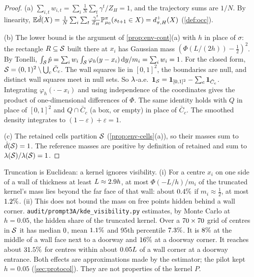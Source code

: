 \begin{proof}
(a) $\sum_{i,t}w_{i,t}=\sum_i\frac1N\sum_t\gamma^t/Z_H=1$, and the trajectory sums are $1/N$. By linearity, $\E\hat d(X)=\frac1N\sum_i\sum_t\frac{\gamma^t}{Z_H}\Prob^\pi_{\mu_0}(s_{t+1}\in X)=d^+_{\pi,H}(X)$ (\cref{def:occ}).

(b) The lower bound is the argument of \cref{prop:env-cont}(a) with $h$ in place of $\sigma$: the rectangle $R\subseteq\cS$ built there at $x_i$ has Gaussian mass $(\Phi(L/(2h))-\frac12)^2$.
By Tonelli, $\int_\cS\hat p=\sum_iw_i\int_\cS\varphi_h(y-x_i)\dd y/m_i=\sum_iw_i=1$.
For the closed form, $\cS=(0,1)^2\setminus\bigcup_c\bar C_c$. The wall squares lie in $[0,1]^2$, the boundaries are null, and distinct wall squares meet in null sets.
So $\Leb$-a.e.\ $\ind_\cS=\ind_{[0,1]^2}-\sum_c\ind_{\bar C_c}$. Integrating $\varphi_h(\cdot-x_i)$ and using independence of the coordinates gives the product of one-dimensional differences of $\Phi$.
The same identity holds with $Q$ in place of $[0,1]^2$ and $Q\cap\bar C_c$ (a box, or empty) in place of $\bar C_c$.
The smoothed density integrates to $(1-\varepsilon)+\varepsilon=1$.

(c) The retained cells partition $\cS$ (\cref{prop:env-cells}(a)), so their masses sum to $\hat d(\cS)=1$. The reference masses are positive by definition of retained and sum to $\Leb(\cS)/\Leb(\cS)=1$.
\end{proof}

\begin{remark}\label{rem:env-kde}
Truncation is Euclidean: a kernel ignores visibility.
(i) For a centre $x_i$ on one side of a wall of thickness at least $L\approx\vn{const.Lh}{2.9}h$, at most $\Phi(-L/h)/m_i$ of the truncated kernel's mass lies beyond the far face of that wall: about $\vn{const.kde_tail_half_pct}{0.4}\%$ if $m_i\approx\frac12$, at most $\vn{const.kde_tail_max_pct}{1.2}\%$.
(ii) This does not bound the mass on free points hidden behind a wall corner.
\texttt{audit/prompt3A/kde\_visibility.py} estimates, by Monte Carlo at $h=0.05$, the hidden share of the truncated kernel.
Over a $\vn{kde.grid}{70\times70}$ grid of centres in $\cS$ it has median $\vn{kde.median}{0}$, mean $\vn{kde.mean_pct}{1.1}\%$ and 95th percentile $\vn{kde.p95_pct}{7.3}\%$.
It is $\vn{kde.face_pct}{8}\%$ at the middle of a wall face next to a doorway and $\vn{kde.doorway_pct}{16}\%$ at a doorway corner.
It reaches about $\vn{kde.max_pct}{31.5}\%$ for centres within about $\vn{kde.max_dist}{0.05}L$ of a wall corner at a doorway entrance.
Both effects are approximations made by the estimator; the pilot kept $h=0.05$ (\cref{sec:protocol}). They are not properties of the kernel $P$.
\end{remark}

